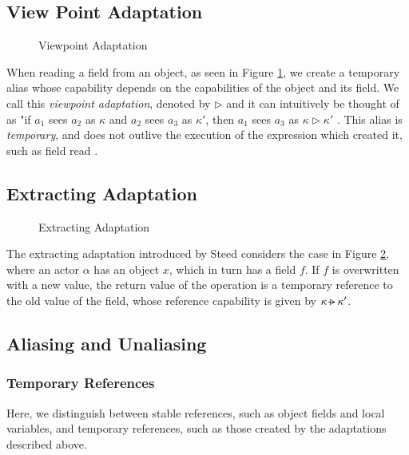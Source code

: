 \subsection{View Point Adaptation}

\begin{figure}[h]
    \centering
    
    \caption{Viewpoint Adaptation}
    \label{fig:viewpoint}
\end{figure}

When reading a field from an object, as seen in Figure \ref{fig:viewpoint}, we create a temporary alias whose capability depends on the capabilities of the object and its field. We call this \textit{viewpoint adaptation}, denoted by $\triangleright$ and it can intuitively be thought of as "if \textit{$a_1$} sees \textit{$a_2$} as $\kappa$ and \textit{$a_2$} sees \textit{$a_3$} as $\kappa'$, then \textit{$a_1$} sees \textit{$a_3$} as  $\kappa \triangleright \kappa'$ \cite{Cunningham2008}. This alias is \textit{temporary}, and does not outlive the execution of the expression which created it, such as field read \cite{Clebsch2015}.

\subsection{Extracting Adaptation} \label{extracting}

\begin{figure}[h]
    \centering
    
    \caption{Extracting Adaptation}
    \label{fig:extracting}
\end{figure}

The extracting adaptation introduced by Steed \cite{Steed2016} considers the case in Figure \ref{fig:extracting}, where an actor $\alpha$ has an object $x$, which in turn has a field $f$. If $f$ is overwritten with a new value, the return value of the operation is a temporary reference to the old value of the field, whose reference capability is given by $\kappa \extract \kappa'$.

\subsection{Aliasing and Unaliasing}

\subsubsection{Temporary References}

Here, we distinguish between stable references, such as object fields and local variables, and temporary references, such as those created by the adaptations described above.

